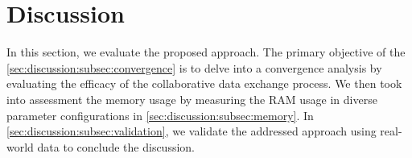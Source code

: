 \label{sec:discussion:subsec:convergence}

\section{Discussion}
\label{sec:evaluation}

In this section, we evaluate the proposed approach. The primary objective of the \cref{sec:discussion:subsec:convergence} is to delve into a convergence analysis by evaluating the efficacy of the collaborative data exchange process. We then took into assessment the memory usage by measuring the RAM usage in diverse parameter configurations in \cref{sec:discussion:subsec:memory}. In \cref{sec:discussion:subsec:validation}, we validate the addressed approach using real-world data to conclude the discussion. 

